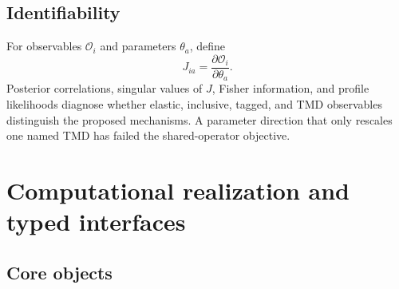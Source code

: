 \documentclass[11pt]{article}
\newcommand{\cO}{\mathcal O}
\begin{document}
\subsection{Identifiability}

For observables \(\cO_i\) and parameters \(\theta_a\), define
\begin{equation}
 J_{ia}=\frac{\partial\cO_i}{\partial\theta_a}.
\label{eq:nuclear-sensitivity-jacobian}
\end{equation}
Posterior correlations, singular values of \(J\), Fisher information, and
profile likelihoods diagnose whether elastic, inclusive, tagged, and TMD
observables distinguish the proposed mechanisms.  A parameter direction that
only rescales one named TMD has failed the shared-operator objective.

\section{Computational realization and typed interfaces}
\label{sec:software}

\subsection{Core objects}
\end{document}
